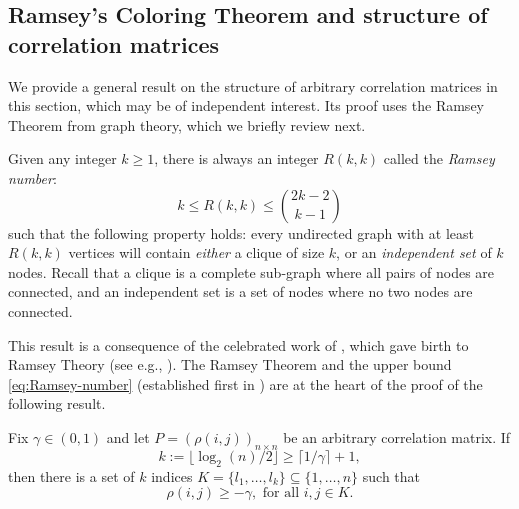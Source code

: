 \subsection{Ramsey's Coloring Theorem and structure of correlation matrices} \label{subsec:Ramsey}

We provide a general result on the structure of arbitrary correlation matrices in this section, which may be of independent interest. 
Its proof uses the Ramsey Theorem from graph theory, which we briefly review next.

Given any integer $k\ge 1$, there is always an integer $R(k,k)$ called the {\em Ramsey number}:
\begin{equation}\label{eq:Ramsey-number}
k\le R(k,k)\le { 2k-2 \choose k-1 }
\end{equation}
such that the following property holds:
every undirected graph with at least $R(k,k)$ vertices will contain {\em either} a clique of size $k$, or an {\em independent set} of $k$ nodes. 
Recall that a clique is a complete sub-graph where all pairs of nodes are connected, and an independent set is a set of nodes where no two nodes are connected.

This result is a consequence of the celebrated work of \citet{ramsey2009problem}, which 
gave birth to Ramsey Theory (see e.g., \citet{conlon2015recent}).  
The Ramsey Theorem and the upper bound \eqref{eq:Ramsey-number} (established first in \cite{erdos1935combinatorial}) are at the heart of the proof of the following result.

\begin{proposition} \label{prop:lower-bound-correlation-Ramsey}
  Fix $\gamma\in(0,1)$ and let $P = \left(\rho(i,j)\right)_{n\times n}$ be an arbitrary correlation
  matrix. If 
  \begin{equation}\label{eq:Ramsey-the-k-def}
   k:= \lfloor \log_2({n})/2 \rfloor  \ge \lceil 1/\gamma \rceil + 1,
  \end{equation}
  then there is a set of $k$ indices $K = \{l_1, \ldots, l_k\}\subseteq \{1,\ldots,n\}$ 
  such that 
  \begin{equation} \label{eq:lower-bound-correlation-Ramsey}
      \rho(i,j) \ge -\gamma, \mbox{ for all } i,j\in K.
  \end{equation}
\end{proposition}

